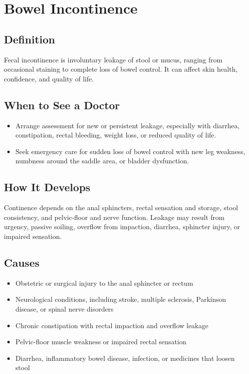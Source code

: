 \chapter{Bowel Incontinence}

\section*{Definition}
Fecal incontinence is involuntary leakage of stool or mucus, ranging from occasional staining to complete loss of bowel control. It can affect skin health, confidence, and quality of life.

\section*{When to See a Doctor}

\begin{itemize}
  \item Arrange assessment for new or persistent leakage, especially with diarrhea, constipation, rectal bleeding, weight loss, or reduced quality of life.
  \item Seek emergency care for sudden loss of bowel control with new leg weakness, numbness around the saddle area, or bladder dysfunction.
\end{itemize}

\section*{How It Develops}
Continence depends on the anal sphincters, rectal sensation and storage, stool consistency, and pelvic-floor and nerve function. Leakage may result from urgency, passive soiling, overflow from impaction, diarrhea, sphincter injury, or impaired sensation.

\section*{Causes}
\begin{itemize}
 \item Obstetric or surgical injury to the anal sphincter or rectum
 \item Neurological conditions, including stroke, multiple sclerosis, Parkinson disease, or spinal nerve disorders
 \item Chronic constipation with rectal impaction and overflow leakage
 \item Pelvic-floor muscle weakness or impaired rectal sensation
 \item Diarrhea, inflammatory bowel disease, infection, or medicines that loosen stool
\end{itemize}

